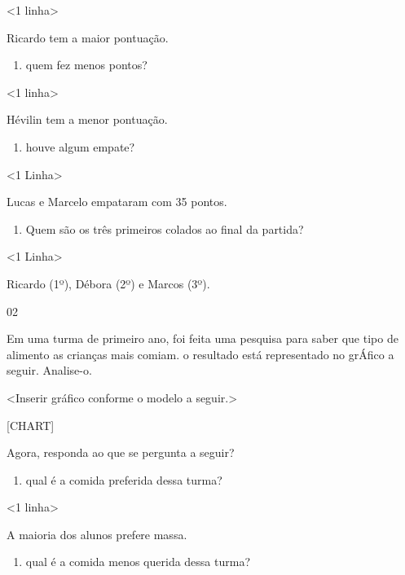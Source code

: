 \textless{}1 linha\textgreater{}

Ricardo tem a maior pontuação.

\begin{enumerate}
\def\labelenumi{\Alph{enumi})}
\item
  quem fez menos pontos?
\end{enumerate}

\textless{}1 linha\textgreater{}

Hévilin tem a menor pontuação.

\begin{enumerate}
\def\labelenumi{\Alph{enumi})}
\item
  houve algum empate?
\end{enumerate}

\textless{}1 Linha\textgreater{}

Lucas e Marcelo empataram com 35 pontos.

\begin{enumerate}
\def\labelenumi{\Alph{enumi})}
\item
  Quem são os três primeiros colados ao final da partida?
\end{enumerate}

\textless{}1 Linha\textgreater{}

Ricardo (1º), Débora (2º) e Marcos (3º).

\num{02}

Em uma turma de primeiro ano, foi feita uma pesquisa para saber que tipo de alimento as
crianças mais comiam. o resultado está representado no grÁfico a seguir. Analise-o.

\textless{}Inserir gráfico conforme o modelo a seguir.\textgreater{}

{{[}CHART{]}}

Agora, responda ao que se pergunta a seguir?

\begin{enumerate}
\def\labelenumi{\Alph{enumi})}
\item
  qual é a comida preferida dessa turma?
\end{enumerate}

\textless{}1 linha\textgreater{}

A maioria dos alunos prefere massa.

\begin{enumerate}
\def\labelenumi{\Alph{enumi})}
\item
  qual é a comida menos querida dessa turma?
\end{enumerate}

